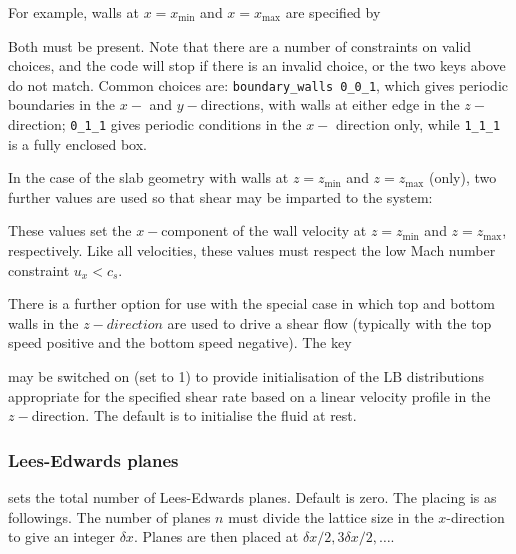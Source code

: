 For example, walls at $x = x_{\min}$  and $x = x_{\max}$  are specified
by



Both must be present. Note that there are a number of constraints on
valid choices, and the code will stop if there is an invalid choice, or
the two keys above do not match. Common choices are:
\texttt{boundary\_walls 0\_0\_1},
which gives periodic boundaries in the $x-$ and $y-$directions, with
walls at either edge in the $z-$direction; \texttt{0\_1\_1}
gives periodic conditions in the $x-$ direction only, while
\texttt{1\_1\_1} is a fully enclosed box.

In the case of the slab geometry with walls at $z = z_{\min}$ and
$z= z_{\max}$ (only),
two further values are used so that shear may be imparted to the system:



These values set the $x-$component of the wall velocity at
$z = z_{\min}$ and $z = z_{\max}$, respectively. Like all
velocities, these values must respect the low Mach number
constraint $u_x < c_s$.

There is a further option for use with the special case in which
top and bottom walls in the $z-direction$ are used to drive a shear
flow (typically with the top speed positive and the bottom speed
negative). The key


may be switched on (set to 1) to provide initialisation of the
LB distributions appropriate for the specified shear rate based
on a linear velocity profile in the $z-$direction. The default
is to initialise the fluid at rest.

\subsubsection{Lees-Edwards planes}


sets the total number of Lees-Edwards planes. Default is zero.
The placing is as followings. The number of planes $n$ must
divide the lattice size in the $x$-direction to give an integer
$\delta x$. Planes are then placed at $\delta x / 2, 3\delta x/2, \ldots$.



